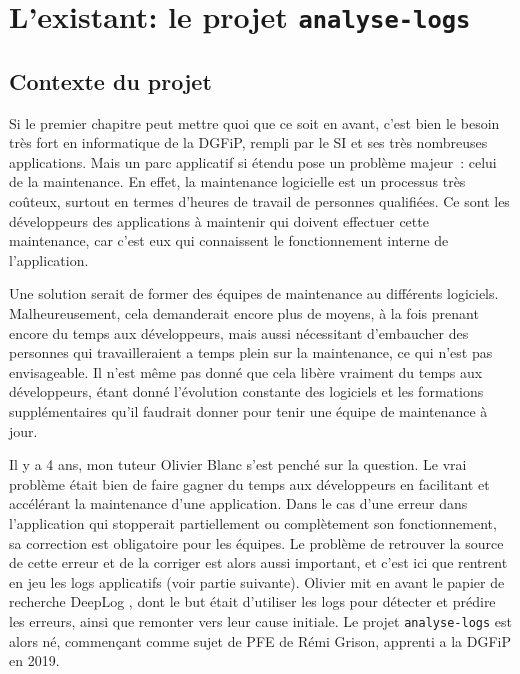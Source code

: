 \documentclass[openany, 12pt]{memoir}
\begin{document}

\newpage
\chapter{L'existant: le projet \texttt{analyse-logs}}

\section{Contexte du projet}

Si le premier chapitre peut mettre quoi que ce soit en avant, c'est bien le besoin très fort en informatique de la \gls{DGFiP}, rempli par le \gls{SI} et ses très nombreuses applications. Mais un parc applicatif si étendu pose un problème majeur~: celui de la maintenance. En effet, la maintenance logicielle est un processus très coûteux, surtout en termes d'heures de travail de personnes qualifiées. Ce sont les développeurs des applications à maintenir qui doivent effectuer cette maintenance, car c'est eux qui connaissent le fonctionnement interne de l'application.

Une solution serait de former des équipes de maintenance au différents logiciels. Malheureusement, cela demanderait encore plus de moyens, à la fois prenant encore du temps aux développeurs, mais aussi nécessitant d'embaucher des personnes qui travailleraient a temps plein sur la maintenance, ce qui n'est pas envisageable. Il n'est même pas donné que cela libère vraiment du temps aux développeurs, étant donné l'évolution constante des logiciels et les formations supplémentaires qu'il faudrait donner pour tenir une équipe de maintenance à jour.

\bigskip
Il y a 4 ans, mon tuteur Olivier Blanc s'est penché sur la question. Le vrai problème était bien de faire gagner du temps aux développeurs en facilitant et accélérant la maintenance d'une application. Dans le cas d'une erreur dans l'application qui stopperait partiellement ou complètement son fonctionnement, sa correction est obligatoire pour les équipes. Le problème de retrouver la source de cette erreur et de la corriger est alors aussi important, et c'est ici que rentrent en jeu les \glspl{log} applicatifs (voir partie suivante). Olivier mit en avant le papier de recherche DeepLog \cite{deeplog}, dont le but était d'utiliser les logs pour détecter et prédire les erreurs, ainsi que remonter vers leur cause initiale. Le projet \texttt{analyse-logs} est alors né, commençant comme sujet de PFE de Rémi Grison, apprenti a la DGFiP en 2019.
\end{document}
